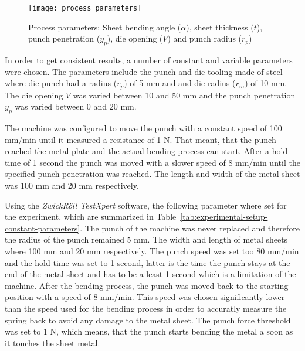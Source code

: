\begin{figure}[h]
    \begin{tcolorbox}[arc=0pt,boxrule=0.5pt]
        \centering
        \texttt{[image: process\_parameters]}
        \caption{Process parameters: Sheet bending angle ($\alpha$), sheet thickness ($t$), punch
        penetration ($y_p$), die opening ($V$) and punch radius ($r_p$)}
        \label{fig:process_parameters}
    \end{tcolorbox}
\end{figure}

In order to get consistent results, a number of constant and variable parameters were chosen.
The parameters include the punch-and-die tooling made of steel where die punch had a radius
($r_p$) of 5 mm and and
die radius ($r_m$) of 10 mm. The die opening $V$ was varied between 10 and 50 mm and the punch
penetration $y_p$ was
varied between 0 and 20 mm.

The machine was configured to move the punch with a constant speed of 100 mm/min until it
measured a resistance of 1 N.
That meant, that the punch reached the metal plate and the actual bending process can start.
After a hold time of 1 second the punch was moved with a slower speed of 8 mm/min until the
specified punch penetration was reached.
The length and width of the metal sheet was 100 mm and 20 mm respectively.

Using the \textit{ZwickRöll TestXpert} software, the following parameter where set for the
experiment, which are summarized in Table~\ref{tab:experimental-setup-constant-parameters}.
The punch of the machine was never replaced and therefore the radius of the punch remained
5 mm.
The width and length of metal sheets where 100 mm and 20 mm respectively.
The punch speed was set too 80 mm/min and the hold time was set to 1 second, latter is the time
the punch stays at the end of the metal sheet and has to be a least 1 second which is a limitation
of the machine.
After the bending process, the punch was moved back to the starting position with a speed of
8 mm/min.
This speed was chosen significantly lower than the speed used for the bending process
in order to accuratly measure the spring back to avoid any damage to the metal sheet.
The punch force threshold was set to 1 N, which means, that the punch starts bending the metal a
soon as it touches the sheet metal.

